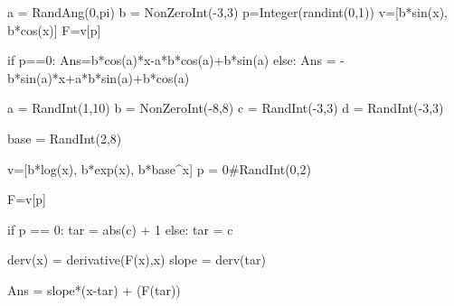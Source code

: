\begin{sagesilent}
a = RandAng(0,pi)
b = NonZeroInt(-3,3)
p=Integer(randint(0,1))
v=[b*sin(x), b*cos(x)]
F=v[p]

if p==0:
   Ans=b*cos(a)*x-a*b*cos(a)+b*sin(a)
else:
   Ans = -b*sin(a)*x+a*b*sin(a)+b*cos(a)
\end{sagesilent}


\begin{sagesilent}
a = RandInt(1,10)
b = NonZeroInt(-8,8)
c = RandInt(-3,3)
d = RandInt(-3,3)

base = RandInt(2,8)

v=[b*log(x), b*exp(x), b*base^x]
p = 0#RandInt(0,2)

F=v[p]

if p == 0:
   tar = abs(c) + 1
else:
   tar = c

derv(x) = derivative(F(x),x)
slope = derv(tar)

Ans = slope*(x-tar) + (F(tar))



\end{sagesilent}




